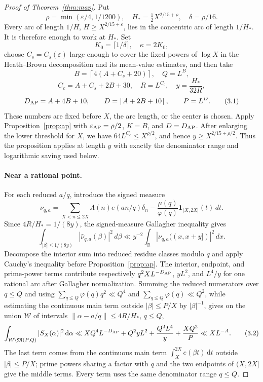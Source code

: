 \documentclass[11pt]{article}
\theoremstyle{remark}
\newcommand{\M}{\mathfrak M}
\newcommand{\eps}{\varepsilon}
\newcommand{\1}{\mathbf 1}
\newcommand{\dd}{\,\mathrm d}
\begin{document}
\begin{proof}[Proof of Theorem~\ref{thm:map}]
Put
\[
 \rho=\min(\eps/4,1/1200),\quad
 H_*=\tfrac12X^{2/15+\rho},\quad
 \delta=\rho/16.
\]
Every arc of length $1/H$, $H\ge X^{2/15+\eps}$, lies in the concentric arc
of length $1/H_*$.  It is therefore enough to work at $H_*$.  Set
\[
 K_0=\lceil1/\delta\rceil,\quad \kappa=2K_0,
\]
choose \(C_s=C_s(\eps)\) large enough to cover the fixed powers of \(\log X\)
in the Heath--Brown decomposition and its mean-value estimates, and then take
\[
 B=\left\lceil4(A+C_s+20)\right\rceil,\quad Q=L^B,
\]
\[
 C_c=A+C_s+2B+30,\quad R=L^{C_c},\quad
 y=\frac{H_*}{32R},
\]
\[
 D_{\rm AP}=A+4B+10,\qquad
 D=\left\lceil A+2B+10\right\rceil,\qquad P=L^D.     \tag{3.1}
\]
These numbers are fixed before $X$, the arc length, or the center is chosen.
Apply Proposition~\ref{prop:ap} with
$\eps_{\rm AP}=\rho/2$, $K=B$, and $D=D_{\rm AP}$.  After enlarging the
lower threshold for $X$, we have
$64L^{C_c}\le X^{\rho/2}$, and hence
$y\ge X^{2/15+\rho/2}$.  Thus the proposition applies at length $y$ with
exactly the denominator range and logarithmic saving used below.

\paragraph{Near a rational point.}
For each reduced $a/q$, introduce the signed measure
\[
 \nu_{q,a}=\sum_{X<n\le2X}\Lambda(n)e(an/q)\delta_n
 -\frac{\mu(q)}{\varphi(q)}\mathbf1_{(X,2X]}(t)\,dt.
\]
Since $4R/H_*=1/(8y)$, the signed-measure Gallagher inequality gives
\[
 \int_{|\beta|\le1/(8y)}|\widehat\nu_{q,a}(\beta)|^2\,d\beta
 \ll y^{-2}\int_{\mathbb R}|\nu_{q,a}((x,x+y])|^2\,dx.
\]
Decompose the interior sum into reduced residue classes modulo $q$ and apply
Cauchy's inequality before Proposition~\ref{prop:ap}.  The interior,
endpoint, and prime-power terms contribute respectively
$q^2XL^{-D_{\rm AP}}$, $yL^2$, and $L^4/y$ for one rational arc after
Gallagher normalization.  Summing the reduced numerators over $q\le Q$ and
using $\sum_{q\le Q}\varphi(q)q^2\ll Q^4$ and
$\sum_{q\le Q}\varphi(q)\ll Q^2$, while estimating the continuous main term
outside $|\beta|\le P/X$ by $|\beta|^{-1}$, gives on the union $\mathcal W$ of intervals
$\|\alpha-a/q\|\le4R/H_*$, $q\le Q$,
\[
 \int_{\mathcal W\setminus\M(P,Q)}|S_X(\alpha)|^2\dd\alpha
 \ll XQ^4L^{-D_{\rm AP}}+Q^2yL^2+\frac{Q^2L^4}{y}+\frac{XQ^2}{P}
 \ll XL^{-A}.                                          \tag{3.2}
\]
The last term comes from the continuous main term
$\int_X^{2X}e(\beta t)\dd t$ outside $|\beta|\le P/X$; prime powers sharing
a factor with $q$ and the two endpoints of $(X,2X]$ give the middle terms.
Every term uses the same
denominator range \(q\le Q\).


\end{proof}
\end{document}
